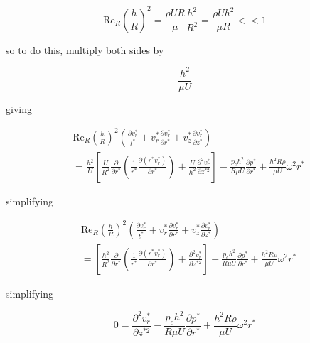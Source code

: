 \begin{equation*}
  \text{Re}_{R}\left(\frac{h}{R}\right)^{2}=
  \frac{\rho{}UR}{\mu}\frac{h^{2}}{R^{2}}=
  \frac{\rho{}Uh^{2}}{\mu{}R}<<1
\end{equation*}

so to do this, multiply both sides by

\begin{equation*}
  \frac{h^{2}}{\mu{}U}
\end{equation*}

giving

\begin{equation*}
  \begin{split}
    &\text{Re}_{R}\left(\frac{h}{R}\right)^{2}\left(\frac{\partial{}v_{r}^{*}}{t^{*}}+v_{r}^{*}\frac{\partial{}v_{r}^{*}}{\partial{}r^{*}}+v_{z}^{*}\frac{\partial{}v_{r}^{*}}{\partial{}z^{*}}\right) \\
    &=\frac{h^{2}}{U}\left[\frac{U}{R^{2}}\frac{\partial}{\partial{}r^{*}}\left(\frac{1}{r^{*}}\frac{\partial(r^{*}v_{r}^{*})}{\partial{}r^{*}}\right)+\frac{U}{h^{2}}\frac{\partial^{2}v_{r}^{*}}{\partial{}z^{*2}}\right]-\frac{p_{c}h^{2}}{R\mu{}U}\frac{\partial{}p^{*}}{\partial{}r^{*}}+\frac{h^{2}R\rho}{\mu{}U}\omega^{2}r^{*}
  \end{split}
\end{equation*}

simplifying

\begin{equation*}
  \begin{split}
    &\text{Re}_{R}\left(\frac{h}{R}\right)^{2}\left(\frac{\partial{}v_{r}^{*}}{t^{*}}+v_{r}^{*}\frac{\partial{}v_{r}^{*}}{\partial{}r^{*}}+v_{z}^{*}\frac{\partial{}v_{r}^{*}}{\partial{}z^{*}}\right) \\
    &=\left[\frac{h^{2}}{R^{2}}\frac{\partial}{\partial{}r^{*}}\left(\frac{1}{r^{*}}\frac{\partial(r^{*}v_{r}^{*})}{\partial{}r^{*}}\right)+\frac{\partial^{2}v_{r}^{*}}{\partial{}z^{*2}}\right]-\frac{p_{c}h^{2}}{R\mu{}U}\frac{\partial{}p^{*}}{\partial{}r^{*}}+\frac{h^{2}R\rho}{\mu{}U}\omega^{2}r^{*}
  \end{split}
\end{equation*}

simplifying

\begin{equation*}
  0=\frac{\partial^{2}v_{r}^{*}}{\partial{}z^{*2}}-\frac{p_{c}h^{2}}{R\mu{}U}\frac{\partial{}p^{*}}{\partial{}r^{*}}+\frac{h^{2}R\rho}{\mu{}U}\omega^{2}r^{*}
\end{equation*}

